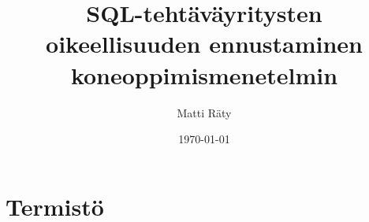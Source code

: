\documentclass[finnish,twoside,openright]{HYgraduMLDS}
\title{SQL-tehtäväyritysten oikeellisuuden ennustaminen koneoppimismenetelmin}
\author{Matti Räty}
\date{\today}
\begin{document}
\maketitle


\begin{abstract}

\end{abstract}

\mytableofcontents

\mynomenclature


\chapter*{Termistö}
\end{document}
